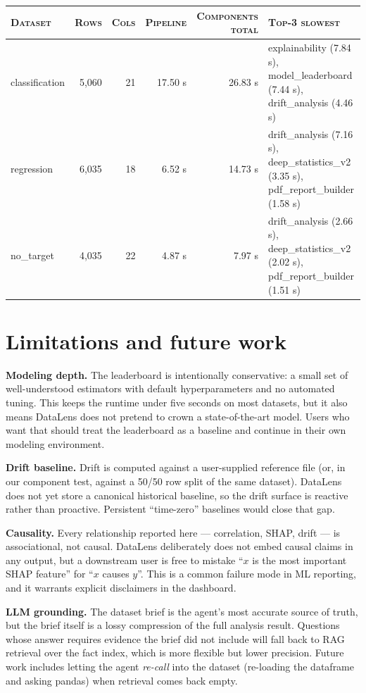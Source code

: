 \documentclass[11pt,a4paper]{article}
\begin{document}
\begin{tabularx}{\linewidth}{l r r r r X}
\toprule
\textsc{Dataset} & \textsc{Rows} & \textsc{Cols} & \textsc{Pipeline} &
\textsc{Components total} & \textsc{Top-3 slowest} \\
\midrule
classification & 5,060 & 21 & 17.50 s & 26.83 s & explainability (7.84 s), model\_leaderboard (7.44 s), drift\_analysis (4.46 s) \\
regression & 6,035 & 18 & 6.52 s & 14.73 s & drift\_analysis (7.16 s), deep\_statistics\_v2 (3.35 s), pdf\_report\_builder (1.58 s) \\
no\_target & 4,035 & 22 & 4.87 s & 7.97 s & drift\_analysis (2.66 s), deep\_statistics\_v2 (2.02 s), pdf\_report\_builder (1.51 s) \\
\bottomrule
\end{tabularx}


\section{Limitations and future work}\label{sec:limits}

\textbf{Modeling depth.} The leaderboard is intentionally conservative: a
small set of well-understood estimators with default hyperparameters and
no automated tuning. This keeps the runtime under five seconds on most
datasets, but it also means DataLens does not pretend to crown a
state-of-the-art model. Users who want that should treat the leaderboard
as a baseline and continue in their own modeling environment.

\textbf{Drift baseline.} Drift is computed against a user-supplied reference
file (or, in our component test, against a 50/50 row split of the same
dataset). DataLens does not yet store a canonical historical baseline, so
the drift surface is reactive rather than proactive. Persistent
``time-zero'' baselines would close that gap.

\textbf{Causality.} Every relationship reported here --- correlation,
SHAP, drift --- is associational, not causal. DataLens deliberately does not
embed causal claims in any output, but a downstream user is free to mistake
``$x$ is the most important SHAP feature'' for ``$x$ causes $y$''. This is a
common failure mode in ML reporting, and it warrants explicit disclaimers
in the dashboard.

\textbf{LLM grounding.} The dataset brief is the agent's most accurate
source of truth, but the brief itself is a lossy compression of the full
analysis result. Questions whose answer requires evidence the brief did not
include will fall back to RAG retrieval over the fact index, which is more
flexible but lower precision. Future work includes letting the agent
\emph{re-call} into the dataset (re-loading the dataframe and asking pandas)
when retrieval comes back empty.
\end{document}
